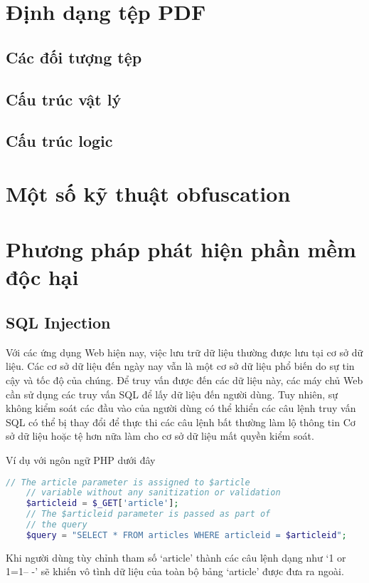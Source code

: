 \documentclass[./../main.tex]{subfiles}
\begin{document}
\section{Định dạng tệp PDF}
\subsection{Các đối tượng tệp}
\subsection{Cấu trúc vật lý}
\subsection{Cấu trúc logic}

\section{Một số kỹ thuật obfuscation}

\section{Phương pháp phát hiện phần mềm độc hại}




\subsection{SQL Injection}

Với các ứng dụng Web hiện nay, việc lưu trữ dữ liệu thường được lưu tại
cơ sở dữ liệu. Các cơ sở dữ liệu đến ngày nay vẫn là một cơ sở dữ liệu
phổ biến do sự tin cậy và tốc độ của chúng. Để truy vấn được đến các dữ
liệu này, các máy chủ Web cần sử dụng các truy vấn SQL để lấy dữ liệu đến
người dùng. Tuy nhiên, sự không kiểm soát các đầu vào của người dùng có
thể khiển các câu lệnh truy vấn SQL có thể bị thay đổi để thực thi các câu
lệnh bất thường làm lộ thông tin Cơ sở dữ liệu hoặc tệ hơn nữa làm cho cơ
sở dữ liệu mất quyền kiểm soát.

Ví dụ với ngôn ngữ PHP dưới đây
\begin{lstlisting}[language=php, caption=Lỗ hổng SQL Injection]
    // The article parameter is assigned to $article
    // variable without any sanitization or validation
    $articleid = $_GET['article'];
    // The $articleid parameter is passed as part of
    // the query
    $query = "SELECT * FROM articles WHERE articleid = $articleid";
\end{lstlisting}
Khi người dùng tùy chỉnh tham số `article' thành các câu lệnh dạng như
`1 or 1=1-- -' sẽ khiến vô tình dữ liệu của toàn bộ bảng `article' được
đưa ra ngoài.
\end{document}
